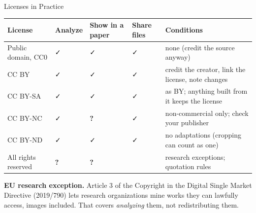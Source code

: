 \newcommand{\yes}{\textcolor{wurgreen}{\faCheck}}
\newcommand{\no}{\textcolor{warnborder}{\faTimes}}
\newcommand{\maybe}{\textcolor{midgray}{\textbf{?}}}
\begin{frame}{Licenses in Practice}
\vspace{0.1cm}
{\footnotesize
\begin{tabular}{@{}l>{\centering\arraybackslash}p{1.1cm}>{\centering\arraybackslash}p{1.5cm}>{\centering\arraybackslash}p{1.1cm}>{\raggedright\arraybackslash}p{6.0cm}@{}}
\toprule
\textbf{License} & \textbf{Analyze} & \textbf{Show in a paper} & \textbf{Share files} & \textbf{Conditions} \\
\midrule
Public domain, CC0 & \yes & \yes & \yes & none (credit the source anyway) \\
CC BY & \yes & \yes & \yes & credit the creator, link the license, note changes \\
CC BY-SA & \yes & \yes & \yes & as BY; anything built from it keeps the license \\
CC BY-NC & \yes & \maybe & \yes & non-commercial only; check your publisher \\
CC BY-ND & \yes & \yes & \yes & no adaptations (cropping can count as one) \\
All rights reserved & \maybe & \maybe & \no & research exceptions; quotation rules \\
\bottomrule
\end{tabular}}

\vspace{0.15cm}
\begin{graybox}
\textbf{EU research exception.} Article 3 of the Copyright in the Digital Single Market Directive
(2019/790) lets research organizations mine works they can lawfully access, images included.
That covers \emph{analyzing} them, not redistributing them.
\end{graybox}
\end{frame}

